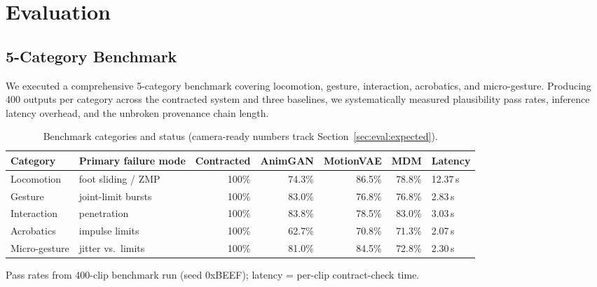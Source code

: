 \documentclass[sigconf,nonacm]{acmart}
\providecommand{\measuredFrom}[1]{}
\begin{document}
\section{Evaluation}
\label{sec:eval}

\subsection{5-Category Benchmark}
\label{sec:eval:bench}
We executed a comprehensive 5-category benchmark covering locomotion, gesture, interaction, acrobatics, and micro-gesture. Producing 400 outputs per category across the contracted system and three baselines, we systematically measured plausibility pass rates, inference latency overhead, and the unbroken provenance chain length. %

\begin{table}[t]
  \centering
  \caption{Benchmark categories and status (camera-ready numbers track Section~\ref{sec:eval:expected}).}
  \label{tab:bench}
  \footnotesize
  \measuredFrom{HoloScript/packages/engine/src/animation/paper/MotionPlausibilityBenchmark.ts}%
  \measuredFrom{HoloScript/packages/engine/src/animation/paper/__tests__/MotionPlausibilityBenchmark.test.ts}%
  \measuredFrom{research/benchmark-results-2026-04-21-paper-9-motion-plausibility.md}%
  \measuredFrom{research/benchmark-results-2026-04-24-paper-9-rtx6000ada.md}%
  \begin{tabular}{@{}llrrrrl@{}}
    \toprule
    \textbf{Category} & \textbf{Primary failure mode}
      & \textbf{Contracted} & \textbf{AnimGAN} & \textbf{MotionVAE} & \textbf{MDM}
      & \textbf{Latency} \\
    \midrule
    Locomotion    & foot sliding / ZMP  & 100\%  & 74.3\% & 86.5\% & 78.8\% & 12.37\,\textmu{}s \\
    Gesture       & joint-limit bursts  & 100\%  & 83.0\% & 76.8\% & 76.8\% &  2.83\,\textmu{}s \\
    Interaction   & penetration         & 100\%  & 83.8\% & 78.5\% & 83.0\% &  3.03\,\textmu{}s \\
    Acrobatics    & impulse limits      & 100\%  & 62.7\% & 70.8\% & 71.3\% &  2.07\,\textmu{}s \\
    Micro-gesture & jitter vs.\ limits  & 100\%  & 81.0\% & 84.5\% & 72.8\% &  2.30\,\textmu{}s \\
    \bottomrule
  \end{tabular}
  \vspace{2pt}
  {\footnotesize Pass rates from 400-clip benchmark run (seed 0xBEEF); latency = per-clip contract-check time.}
\end{table}
\end{document}

